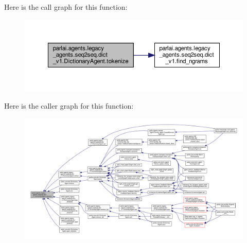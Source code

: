 Here is the call graph for this function\+:
\nopagebreak
\begin{figure}[H]
\begin{center}
\leavevmode
\includegraphics[width=350pt]{classparlai_1_1agents_1_1legacy__agents_1_1seq2seq_1_1dict__v1_1_1DictionaryAgent_af8cf51195d4443615727cf0bdcdace0f_cgraph}
\end{center}
\end{figure}
Here is the caller graph for this function\+:
\nopagebreak
\begin{figure}[H]
\begin{center}
\leavevmode
\includegraphics[width=350pt]{classparlai_1_1agents_1_1legacy__agents_1_1seq2seq_1_1dict__v1_1_1DictionaryAgent_af8cf51195d4443615727cf0bdcdace0f_icgraph}
\end{center}
\end{figure}
\mbox{\label{classparlai_1_1agents_1_1legacy__agents_1_1seq2seq_1_1dict__v1_1_1DictionaryAgent_a8419b546a12830d98e1eb14615744294}} 
